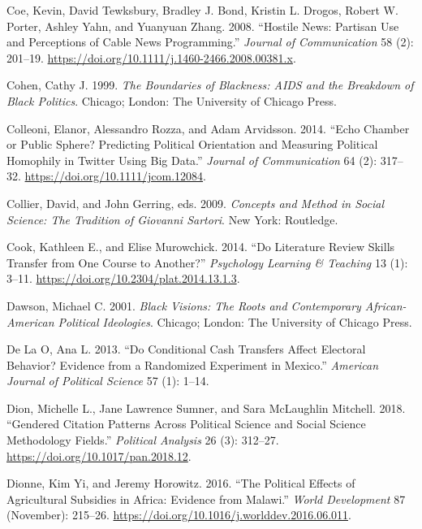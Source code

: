 \documentclass{book}
\newlength{\cslhangindent}
\newlength{\cslentryspacingunit} %
\newenvironment{CSLReferences}[2] %
 {%
  \setlength{\parindent}{0pt}
  \ifodd #1
  \let\oldpar\par
  \def\par{\hangindent=\cslhangindent\oldpar}
  \fi
  \setlength{\parskip}{#2\cslentryspacingunit}
 }%
 {}
\begin{document}
\begin{CSLReferences}{1}{0}
\leavevmode{}%
Coe, Kevin, David Tewksbury, Bradley J. Bond, Kristin L. Drogos, Robert W.
Porter, Ashley Yahn, and Yuanyuan Zhang. 2008. {``Hostile {News}: {Partisan
Use} and {Perceptions} of {Cable News Programming}.''} \emph{Journal of
Communication} 58 (2): 201--19.
\url{https://doi.org/10.1111/j.1460-2466.2008.00381.x}.

\leavevmode{}%
Cohen, Cathy J. 1999. \emph{The Boundaries of Blackness: AIDS and the
Breakdown of Black Politics}. Chicago; London: The University of Chicago
Press.

\leavevmode{}%
Colleoni, Elanor, Alessandro Rozza, and Adam Arvidsson. 2014. {``Echo Chamber
or Public Sphere? Predicting Political Orientation and Measuring Political
Homophily in Twitter Using Big Data.''} \emph{Journal of Communication} 64
(2): 317--32. \url{https://doi.org/10.1111/jcom.12084}.

\leavevmode{}%
Collier, David, and John Gerring, eds. 2009. \emph{Concepts and Method in
Social Science: The Tradition of {Giovanni Sartori}}. {New York}: {Routledge}.

\leavevmode{}%
Cook, Kathleen E., and Elise Murowchick. 2014. {``Do {Literature Review Skills
Transfer} from {One Course} to {Another}?''} \emph{Psychology Learning \&
Teaching} 13 (1): 3--11. \url{https://doi.org/10.2304/plat.2014.13.1.3}.

\leavevmode{}%
Dawson, Michael C. 2001. \emph{Black Visions: The Roots and Contemporary
African-American Political Ideologies}. Chicago; London: The University of
Chicago Press.

\leavevmode{}%
De La O, Ana L. 2013. {``Do {Conditional Cash Transfers Affect Electoral
Behavior}? {Evidence} from a {Randomized Experiment} in {Mexico}.''}
\emph{American Journal of Political Science} 57 (1): 1--14.

\leavevmode{}%
Dion, Michelle L., Jane Lawrence Sumner, and Sara McLaughlin Mitchell. 2018.
{``Gendered Citation Patterns Across Political Science and Social Science
Methodology Fields.''} \emph{Political Analysis} 26 (3): 312--27.
\url{https://doi.org/10.1017/pan.2018.12}.

\leavevmode{}%
Dionne, Kim Yi, and Jeremy Horowitz. 2016. {``The {Political Effects} of
{Agricultural Subsidies} in {Africa}: {Evidence} from {Malawi}.''} \emph{World
Development} 87 (November): 215--26.
\url{https://doi.org/10.1016/j.worlddev.2016.06.011}.


\end{CSLReferences}
\end{document}
